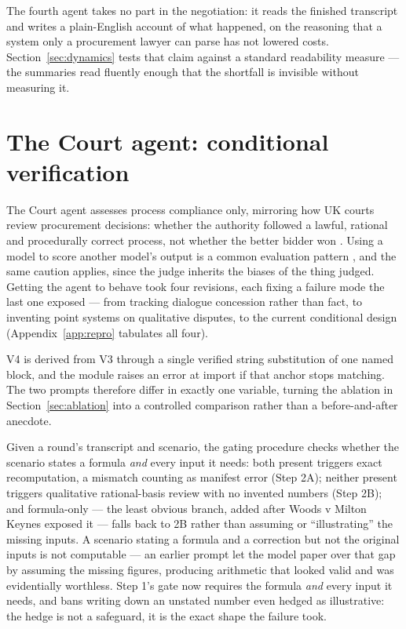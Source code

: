 The fourth agent takes no part in the negotiation: it reads the finished
transcript and writes a plain-English account of what happened, on the
reasoning that a system only a procurement lawyer can parse has not
lowered costs. Section~\ref{sec:dynamics} tests that claim against a
standard readability measure --- the summaries read fluently enough that
the shortfall is invisible without measuring it.

\section{The Court agent: conditional verification}
\label{sec:court-design}

The Court agent assesses process compliance only, mirroring how UK courts
review procurement decisions: whether the authority followed a lawful,
rational and procedurally correct process, not whether the better bidder won
\cite{arrowsmith2014law}. Using a model to score another model's output is a
common evaluation pattern \cite{zheng2023judging}, and the same caution
applies, since the judge inherits the biases of the thing judged. Getting
the agent to behave took four revisions, each fixing a failure mode the
last one exposed --- from tracking dialogue concession rather than fact, to
inventing point systems on qualitative disputes, to the current conditional
design (Appendix~\ref{app:repro} tabulates all four).

V4 is derived from V3 through a single verified string substitution of one
named block, and the module raises an error at import if that anchor stops
matching. The two prompts therefore differ in exactly one variable, turning
the ablation in Section~\ref{sec:ablation} into a controlled comparison
rather than a before-and-after anecdote.

Given a round's transcript and scenario, the gating procedure checks
whether the scenario states a formula \emph{and} every input it needs: both
present triggers exact recomputation, a mismatch counting as manifest
error (Step 2A); neither present triggers qualitative rational-basis
review with no invented numbers (Step 2B); and formula-only --- the least
obvious branch, added after Woods v Milton Keynes exposed it --- falls
back to 2B rather than assuming or ``illustrating'' the missing inputs. A scenario stating a formula and a correction but not the original
inputs is not computable --- an earlier prompt let the model paper over
that gap by assuming the missing figures, producing arithmetic that looked
valid and was evidentially worthless. Step 1's gate now requires the
formula \emph{and} every input it needs, and bans writing down an unstated
number even hedged as illustrative: the hedge is not a safeguard, it is the
exact shape the failure took.

